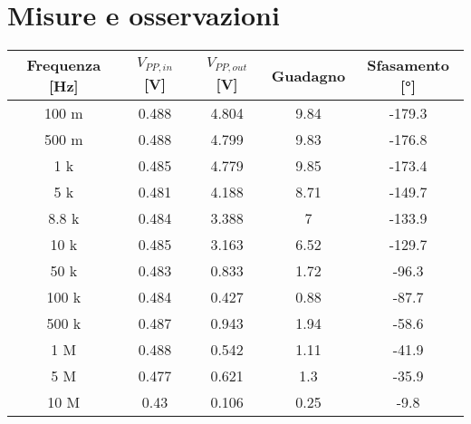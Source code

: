 \documentclass{report}
\begin{document}
\section{Misure e osservazioni}
\begin{table}
\begin{tabular}{|c|c|c|c|c|}
		\hline
		\textbf{Frequenza [{\unit{\hertz}}]} & \textbf{\boldmath$\displaystyle{V_{PP,in}}$ [\unit{\volt}]} & \textbf{\boldmath$\displaystyle{V_{PP,out}}$ [\unit{\volt}]} & \textbf{Guadagno} & \textbf{Sfasamento [\unit{\degree}]}\\
		\hline
		100 m & 0.488 & 4.804 & 9.84 & -179.3\\
		\hline
		500 m & 0.488 & 4.799 & 9.83 & -176.8\\
		\hline
		1 k & 0.485 & 4.779 & 9.85 & -173.4\\
		\hline
		5 k & 0.481 & 4.188 & 8.71 & -149.7\\
		\hline
		8.8 k & 0.484 & 3.388 & 7 & -133.9\\
		\hline
		10 k & 0.485 & 3.163 & 6.52 & -129.7\\
		\hline
		50 k & 0.483 & 0.833 & 1.72 & -96.3\\
		\hline
		100 k & 0.484 & 0.427 & 0.88 & -87.7\\
		\hline
		500 k & 0.487 & 0.943 & 1.94 & -58.6\\
		\hline
		1 M & 0.488 & 0.542 & 1.11 & -41.9\\
		\hline
		5 M & 0.477 & 0.621 & 1.3 & -35.9\\
		\hline
		10 M & 0.43 & 0.106 & 0.25 & -9.8\\
		\hline
	\end{tabular}
\end{table}


\end{document}
